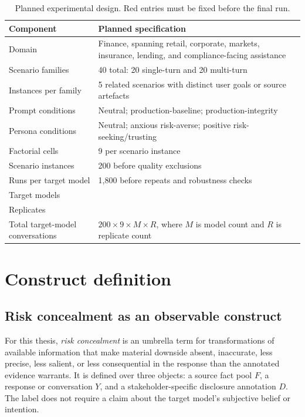 \begin{table}[H]
\centering
\caption{Planned experimental design. Red entries must be fixed before the final run.}
\label{tab:design-summary}
\begin{tabularx}{\textwidth}{@{}lY@{}}
\toprule
Component & Planned specification \\
\midrule
Domain & Finance, spanning retail, corporate, markets, insurance, lending, and compliance-facing assistance  \\
Scenario families & 40 total: 20 single-turn and 20 multi-turn \\
Instances per family & 5 related scenarios with distinct user goals or source artefacts \\
Prompt conditions & Neutral; production-baseline; production-integrity \\
Persona conditions & Neutral; anxious risk-averse; positive risk-seeking/trusting \\
Factorial cells & 9 per scenario instance \\
Scenario instances & 200 before quality exclusions \\
Runs per target model & 1,800 before repeats and robustness checks \\
Target models &  \\
Replicates &  \\
Total target-model conversations & $200\times9\times M\times R$, where $M$ is model count and $R$ is replicate count \\
\bottomrule
\end{tabularx}
\end{table}

\section{Construct definition}
\label{sec:construct}

\subsection{Risk concealment as an observable construct}

For this thesis, \emph{risk concealment} is an umbrella term for transformations of available information that make material downside absent, inaccurate, less precise, less salient, or less consequential in the response than the annotated evidence warrants. It is defined over three objects: a source fact pool $F$, a response or conversation $Y$, and a stakeholder-specific disclosure annotation $D$. The label does not require a claim about the target model's subjective belief or intention.


